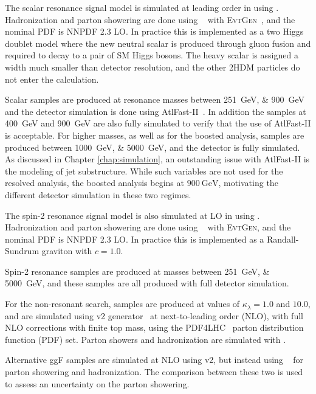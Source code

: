 The scalar resonance signal model is simulated at leading order in \alphas using
\MADGRAPH\cite{MG5}. Hadronization and parton showering are done using
\HERWIG[7]~\cite{Herwig7}\cite{HerwigPP} with \textsc{EvtGen}~\cite{EvtGen},
and the nominal PDF is NNPDF 2.3 LO. In practice this is implemented as a two
Higgs doublet model where the new neutral scalar is produced through gluon
fusion and required to decay to a pair of SM Higgs bosons. The heavy scalar is
assigned a width much smaller than detector resolution, and the other 2HDM
particles do not enter the calculation.

Scalar samples are produced at resonance masses between \SIlist{251;900}{\GeV} and the detector
simulation is done using AtlFast-II~\cite{SOFT-2010-01}. In addition the samples at \SI{400}{\GeV}
and \SI{900}{\GeV} are also fully simulated to verify that the use of AtlFast-II
is acceptable. For higher masses, as well as for the boosted analysis, 
samples are produced between \SIlist{1000;5000}{\GeV}, and the detector is fully simulated.
As discussed in Chapter \ref{chap:simulation}, an outstanding issue with AtlFast-II is the 
modeling of jet substructure. While such variables are not used for the resolved analysis,
the boosted analysis begins at $\SI{900}{\GeV}$, motivating the different detector 
simulation in these two regimes.

The spin-2 resonance signal model is also simulated at LO in \alphas using
\MADGRAPH. Hadronization and parton showering are done using
\PYTHIA[8]~\cite{Pythia} with \textsc{EvtGen}, and the nominal PDF is NNPDF 2.3
LO. In practice this is implemented as a Randall-Sundrum graviton with $c=1.0$.

Spin-2 resonance samples are produced at masses between \SIlist{251;5000}{\GeV}, 
and these samples are all produced with full detector simulation.

For the non-resonant search, samples are produced at values of $\kappa_{\lambda} = 1.0$ and $10.0$, and are simulated
using \POWHEGBOX v2 generator~\cite{Powheg1, Powheg2, Powheg3} at next-to-leading order (NLO), with full 
NLO corrections with finite top mass, using the PDF4LHC~\cite{Butterworth:2015oua} parton distribution 
function (PDF) set. Parton showers and hadronization are simulated with \PYTHIA[8].

Alternative ggF samples are simulated at NLO using \POWHEGBOX v2, but instead using \HERWIG[7]~\cite{Herwigpp} 
for parton showering and hadronization. The comparison between these two is used to assess an uncertainty 
on the parton showering.


